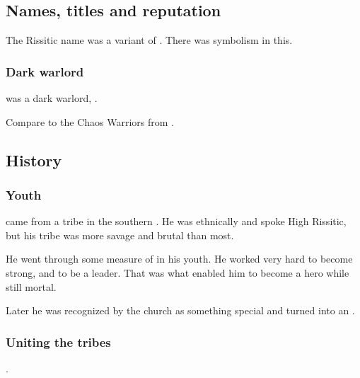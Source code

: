 \subsection{Names, titles and reputation}
The Rissitic name \quo{{\Narkiza}} was a variant of . 
There was symbolism in this. 





\subsubsection{Dark warlord}
\Narkiza was a dark warlord, . 

Compare to the Chaos Warriors from \cite{RPG:Warhammer}. 









\subsection{History}





\subsubsection{Youth}
\Narkiza came from a tribe in the southern \Durcac.
He was ethnically \Durcaci and spoke High Rissitic, but his tribe was more savage and brutal than most. 

He went through some measure of  in his youth.
He worked very hard to become strong, and to be a leader.
That was what enabled him to become a hero while still mortal.

Later he was recognized by the church as something special and turned into an \Ashenoch.





\subsubsection{Uniting the tribes}
\Narkiza {}. 





